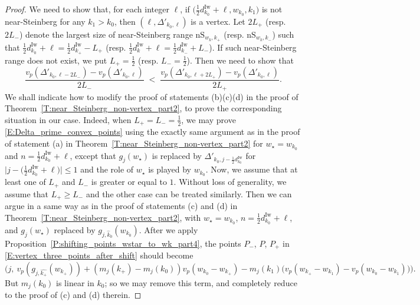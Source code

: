 \begin{proof}
    We need to show that, for each integer $\ell$, if $\big(\frac 12d_{k_0}^{\mathrm{Iw}}+ \ell, w_{k_0}, k_1\big)$ is not  near-Steinberg for any $k_1 > {k_0}$, then $(\ell, \Delta'_{{k_0}, \ell})$ is a vertex. Let $2L_+$ (resp. $2L_-$) denote the largest size of near-Steinberg range ${\mathrm{nS}}_{w_k, k_+}$ (resp. ${\mathrm{nS}}_{w_k, k_-}$) such that $\frac 12d_{k_0}^{\mathrm{Iw}}+\ell = \frac 12d_{k_+}^{\mathrm{Iw}}-L_+$ (resp. $\frac 12d_k^{\mathrm{Iw}}+\ell = \frac 12d_{k_-}^{\mathrm{Iw}}+L_-$). If such near-Steinberg range does not exist, we put $L_+ = \frac 12$ (resp. $L_- = \frac 12$).
    Then we need to show that
    \begin{equation}
    \label{E:Delta_prime_convex_points}
    \frac{v_p(\Delta'_{k_0, \ell - 2L_-}) - v_p(\Delta'_{k_0, \ell})}{2L_-} \;<\; \frac{v_p(\Delta'_{k_0, \ell + 2L_+})-v_p(\Delta'_{k_0, \ell}) }{2L_+}.
    \end{equation}
    We shall indicate how to modify the proof of statements (b)(c)(d) in the proof of Theorem~\ref{T:near_Steinberg_non-vertex_part2}, to prove the corresponding situation in our case.
    Indeed, when $L_+ = L_-=\frac 12$, we may prove \eqref{E:Delta_prime_convex_points} using the exactly same argument as in the proof of statement (a) in Theorem~\ref{T:near_Steinberg_non-vertex_part2} for $w_\star = w_{k_0}$ and $n = \frac 12d_{k_0}^{\mathrm{Iw}}+\ell$, except that $g_j(w_\star)$ is replaced by $\Delta'_{k_0, j - \frac 12 d_{k_0}^{\mathrm{Iw}}}$ for $\big|j -\big(\frac 12 d_{k_0}^{\mathrm{Iw}}+\ell\big)\big| \leq 1$ and the role of $w_\star$ is played by $w_{k_0}$.
    Now, we assume that at least one of $L_+$ and $L_-$ is greater or equal to $1$. Without loss of generality, we assume that $L_+ \geq L_-$ and the other case can be treated similarly. Then we can argue in a same way as in the proof of statements (c) and (d) in Theorem~\ref{T:near_Steinberg_non-vertex_part2}, with $w_\star = w_{k_0}$, $n = \frac 12d_{k_0}^{\mathrm{Iw}}+ \ell$, and $g_j(w_\star)$ replaced by $g_{j, \hat k_0}(w_{k_0})$. After we apply Proposition~\ref{P:shifting_points_wstar_to_wk_part4}, the points $P_-$, $P$, $P_+$ in \eqref{E:vertex_three_points_after_shift} should become
    \begin{equation}
    \label{E:vertex_three_points_after_shift_Delta} \Big( j,\ v_p(g_{j, \hat{ k_+}}(w_{k_+})) + (m_j(k_+)- m_j(k_0))v_p(w_{k_0}-w_{k_+}) - m_j(k_1)\big(v_p(w_{k_+}-w_{k_1})- v_p(w_{k_0}-w_{k_1})  \big)\Big).
    \end{equation}
    But $m_j(k_0)$ is linear in $k_0$; so we may remove this term, and completely reduce to the proof of (c) and (d) therein.
\end{proof}

